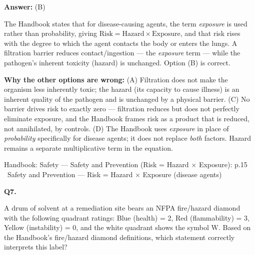 \documentclass[11pt]{article}
\begin{document}
\vspace{2pt}\par\noindent\colorbox{boxbg}{\parbox{\dimexpr\linewidth-2\fboxsep\relax}{%
\vspace{2pt}\textbf{Answer:} (B)\par\vspace{2pt}
{\small The Handbook states that for disease-causing agents, the term \emph{exposure} is used rather than probability, giving $\text{Risk} = \text{Hazard} \times \text{Exposure}$, and that risk rises with the degree to which the agent contacts the body or enters the lungs. A filtration barrier reduces contact/ingestion --- the \emph{exposure} term --- while the pathogen's inherent toxicity (hazard) is unchanged. Option (B) is correct.\par
\textbf{Why the other options are wrong:} (A) Filtration does not make the organism less inherently toxic; the hazard (its capacity to cause illness) is an inherent quality of the pathogen and is unchanged by a physical barrier. (C) No barrier drives risk to exactly zero --- filtration reduces but does not perfectly eliminate exposure, and the Handbook frames risk as a product that is reduced, not annihilated, by controls. (D) The Handbook uses \emph{exposure} in place of \emph{probability} specifically for disease agents; it does not replace \emph{both} factors. Hazard remains a separate multiplicative term in the equation.\par}\par\vspace{2pt}
{\footnotesize\color{soft}Handbook: Safety --- Safety and Prevention (Risk = Hazard $\times$ Exposure): p.15 \textbullet\ Safety and Prevention --- Risk = Hazard $\times$ Exposure (disease agents)}\vspace{2pt}
}}
\vspace{9pt}
\filbreak
\textbf{\color{accent}Q7.}\par\vspace{2pt}
A drum of solvent at a remediation site bears an NFPA fire/hazard diamond with the following quadrant ratings: Blue (health) = 2, Red (flammability) = 3, Yellow (instability) = 0, and the white quadrant shows the symbol $\text{W}$. Based on the Handbook's fire/hazard diamond definitions, which statement correctly interprets this label?\par\par\vspace{3pt}
\end{document}
